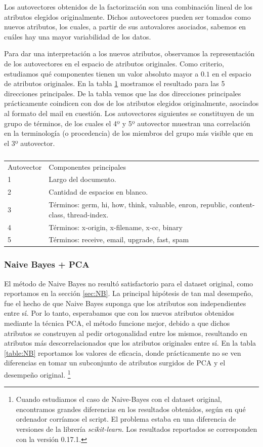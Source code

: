 \documentclass[a4paper,10pt]{article}
\begin{document}
\par Los autovectores obtenidos de la factorización son una combinación lineal de los atributos elegidos originalmente. Dichos autovectores pueden ser tomados como nuevos atributos, los cuales, a partir de sus autovalores asociados, sabemos en cuáles hay una mayor variabilidad de los datos. 
\par Para dar una interpretación a los nuevos atributos, observamos la representación de los autovectores en el espacio de atributos originales. Como criterio, estudiamos qué componentes tienen un valor absoluto mayor a $0.1$ en el espacio de atributos originales. En la tabla \ref{table:autovectores} mostramos el resultado para las 5 direcciones principales. De la tabla vemos que las dos direcciones principales prácticamente coindicen con dos de los atributos elegidos originalmente, asociados al formato del mail en cuestión. Los autovectores siguientes se constituyen de un grupo de términos, de los cuales el 4º y 5º autovector muestran una correlación en la terminología (o procedencia) de los miembros del grupo más visible que en el 3º autovector. 
\begin{table}
\centering
\caption{}
\label{table:autovectores}
\begin{tabular}{ll}
Autovector & Componentes principales \\
1 & Largo del documento. \\
2 & Cantidad de espacios en blanco. \\
3 & Términos: germ, hi, how, think, valuable, enron, republic, content-class, thread-index. \\
4 & Términos: x-origin, x-filename, x-cc, binary \\
5 & Términos: receive, email, upgrade, fast, spam \\
\end{tabular}
\end{table}

\subsubsection{Naive Bayes + PCA}\label{sec:NB_PCA}

\par El método de Naive Bayes no resultó satisfactorio para el dataset original, como reportamos en la sección \ref{sec:NB}. La principal hipótesis de tan mal desempeño, fue el hecho de que Naive Bayes suponga que los atributos son independientes entre sí. Por lo tanto, esperabamos que con los nuevos atributos obtenidos mediante la técnica PCA, el método funcione mejor, debido a que dichos atributos se construyen al pedir ortogonalidad entre los mismos, resultando en atributos más descorrelacionados que los atributos originales entre sí. En la tabla \ref{table:NB} reportamos los valores de eficacia, donde prácticamente no se ven diferencias en tomar un subconjunto de atributos surgidos de PCA y el desempeño original. \footnote{Cuando estudiamos el caso de Naive-Bayes con el dataset original, encontramos grandes diferencias en los resultados obtenidos, según en qué ordenador corríamos el script. El problema estaba en una diferencia de versiones de la librería \emph{scikit-learn}. Los resultados reportados se corresponden con la versión 0.17.1.}
\end{document}
